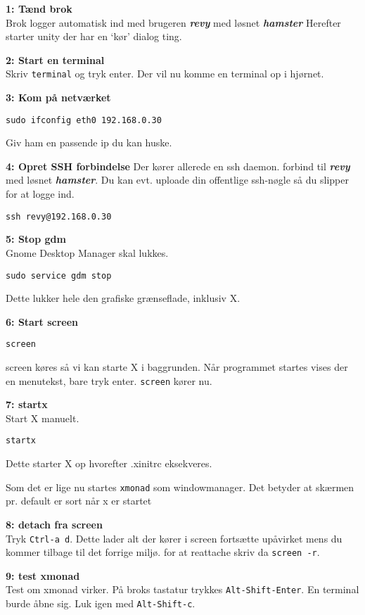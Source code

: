 \documentclass[10pt,a4paper,danish]{article}
\begin{document}
\textbf{1: Tænd brok}\\
Brok logger automatisk ind med brugeren \textbf{\textit{revy}} med løsnet \textbf{\textit{hamster}}
Herefter starter unity der har en `kør' dialog ting.

\textbf{2: Start en terminal}\\
Skriv \texttt{terminal} og tryk enter.
Der vil nu komme en terminal op i hjørnet.

\textbf{3: Kom på netværket}\\
\begin{verbatim}
sudo ifconfig eth0 192.168.0.30
\end{verbatim}
Giv ham en passende ip du kan huske.

\textbf{4: Opret SSH forbindelse}
Der kører allerede en ssh daemon.
forbind til \textbf{\textit{revy}} med løsnet \textbf{\textit{hamster}}.
Du kan evt. uploade din offentlige ssh-nøgle så du slipper for at logge ind.
\begin{verbatim}
ssh revy@192.168.0.30
\end{verbatim}

\textbf{5: Stop gdm}\\
Gnome Desktop Manager skal lukkes.
\begin{verbatim}
sudo service gdm stop
\end{verbatim}
Dette lukker hele den grafiske grænseflade, inklusiv X.

\textbf{6: Start screen}\\
\begin{verbatim}
screen
\end{verbatim}
screen køres så vi kan starte X i baggrunden.
Når programmet startes vises der en menutekst, bare tryk enter.
\texttt{screen} kører nu.

\textbf{7: startx}\\
Start X manuelt.
\begin{verbatim}
startx
\end{verbatim}
Dette starter X op hvorefter .xinitrc eksekveres.

Som det er lige nu startes \texttt{xmonad} som windowmanager.
Det betyder at skærmen pr. default er sort når x er startet


\textbf{8: detach fra screen}\\
Tryk \texttt{Ctrl-a d}. Dette lader alt der kører i screen fortsætte upåvirket
mens du kommer tilbage til det forrige miljø.
for at reattache skriv da \texttt{screen -r}.

\textbf{9: test xmonad}\\
Test om xmonad virker. På broks tastatur trykkes \texttt{Alt-Shift-Enter}.
En terminal burde åbne sig.
Luk igen med \texttt{Alt-Shift-c}.
\end{document}
